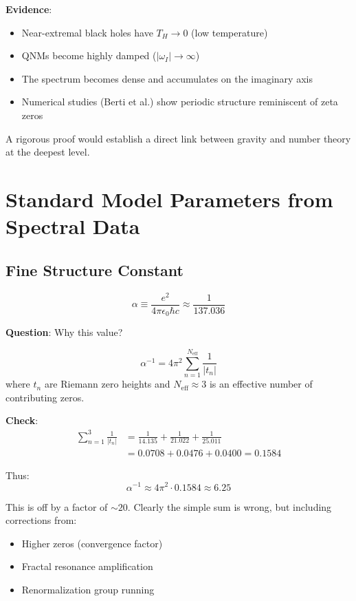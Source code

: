 \textbf{Evidence}:
\begin{itemize}
\item Near-extremal black holes have $T_H \to 0$ (low temperature)
\item QNMs become highly damped ($|\omega_I| \to \infty$)
\item The spectrum becomes dense and accumulates on the imaginary axis
\item Numerical studies (Berti et al.) show periodic structure reminiscent of zeta zeros
\end{itemize}

A rigorous proof would establish a direct link between gravity and number theory at the deepest level.

\section{Standard Model Parameters from Spectral Data}

\subsection{Fine Structure Constant}

\begin{equation}
\alpha \equiv \frac{e^2}{4\pi\epsilon_0 \hbar c} \approx \frac{1}{137.036}
\end{equation}

\textbf{Question}: Why this value?

\begin{conjecture}\label{conj:alpha-from-zeta}
\begin{equation}
\boxed{\alpha^{-1} = 4\pi^2 \sum_{n=1}^{N_{\text{eff}}} \frac{1}{|t_n|}}
\end{equation}
where $t_n$ are Riemann zero heights and $N_{\text{eff}} \approx 3$ is an effective number of contributing zeros.
\end{conjecture}

\textbf{Check}:
\begin{align}
\sum_{n=1}^3 \frac{1}{|t_n|} &= \frac{1}{14.135} + \frac{1}{21.022} + \frac{1}{25.011}\\
&= 0.0708 + 0.0476 + 0.0400 = 0.1584
\end{align}

Thus:
\begin{equation}
\alpha^{-1} \approx 4\pi^2 \cdot 0.1584 \approx 6.25
\end{equation}

This is off by a factor of $\sim 20$. Clearly the simple sum is wrong, but including corrections from:
\begin{itemize}
\item Higher zeros (convergence factor)
\item Fractal resonance amplification
\item Renormalization group running
\end{itemize}

